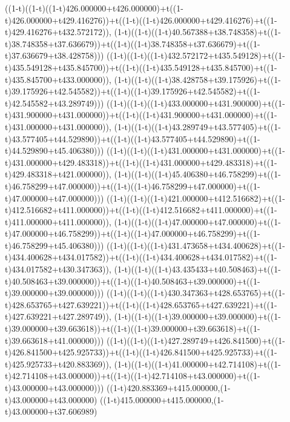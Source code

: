 ((1-t)((1-t)((1-t)426.000000+t426.000000)+t((1-t)426.000000+t429.416276))+t((1-t)((1-t)426.000000+t429.416276)+t((1-t)429.416276+t432.572172)),                                     (1-t)((1-t)((1-t)40.567388+t38.748358)+t((1-t)38.748358+t37.636679))+t((1-t)((1-t)38.748358+t37.636679)+t((1-t)37.636679+t38.428758)))
((1-t)((1-t)((1-t)432.572172+t435.549128)+t((1-t)435.549128+t435.845700))+t((1-t)((1-t)435.549128+t435.845700)+t((1-t)435.845700+t433.000000)),                                     (1-t)((1-t)((1-t)38.428758+t39.175926)+t((1-t)39.175926+t42.545582))+t((1-t)((1-t)39.175926+t42.545582)+t((1-t)42.545582+t43.289749)))
((1-t)((1-t)((1-t)433.000000+t431.900000)+t((1-t)431.900000+t431.000000))+t((1-t)((1-t)431.900000+t431.000000)+t((1-t)431.000000+t431.000000)),                                     (1-t)((1-t)((1-t)43.289749+t43.577405)+t((1-t)43.577405+t44.529890))+t((1-t)((1-t)43.577405+t44.529890)+t((1-t)44.529890+t45.406380)))
((1-t)((1-t)((1-t)431.000000+t431.000000)+t((1-t)431.000000+t429.483318))+t((1-t)((1-t)431.000000+t429.483318)+t((1-t)429.483318+t421.000000)),                                     (1-t)((1-t)((1-t)45.406380+t46.758299)+t((1-t)46.758299+t47.000000))+t((1-t)((1-t)46.758299+t47.000000)+t((1-t)47.000000+t47.000000)))
((1-t)((1-t)((1-t)421.000000+t412.516682)+t((1-t)412.516682+t411.000000))+t((1-t)((1-t)412.516682+t411.000000)+t((1-t)411.000000+t411.000000)),                                     (1-t)((1-t)((1-t)47.000000+t47.000000)+t((1-t)47.000000+t46.758299))+t((1-t)((1-t)47.000000+t46.758299)+t((1-t)46.758299+t45.406380)))
((1-t)((1-t)((1-t)431.473658+t434.400628)+t((1-t)434.400628+t434.017582))+t((1-t)((1-t)434.400628+t434.017582)+t((1-t)434.017582+t430.347363)),                                     (1-t)((1-t)((1-t)43.435433+t40.508463)+t((1-t)40.508463+t39.000000))+t((1-t)((1-t)40.508463+t39.000000)+t((1-t)39.000000+t39.000000)))
((1-t)((1-t)((1-t)430.347363+t428.653765)+t((1-t)428.653765+t427.639221))+t((1-t)((1-t)428.653765+t427.639221)+t((1-t)427.639221+t427.289749)),                                     (1-t)((1-t)((1-t)39.000000+t39.000000)+t((1-t)39.000000+t39.663618))+t((1-t)((1-t)39.000000+t39.663618)+t((1-t)39.663618+t41.000000)))
((1-t)((1-t)((1-t)427.289749+t426.841500)+t((1-t)426.841500+t425.925733))+t((1-t)((1-t)426.841500+t425.925733)+t((1-t)425.925733+t420.883369)),                                     (1-t)((1-t)((1-t)41.000000+t42.714108)+t((1-t)42.714108+t43.000000))+t((1-t)((1-t)42.714108+t43.000000)+t((1-t)43.000000+t43.000000)))
((1-t)420.883369+t415.000000,(1-t)43.000000+t43.000000)
((1-t)415.000000+t415.000000,(1-t)43.000000+t37.606989)
